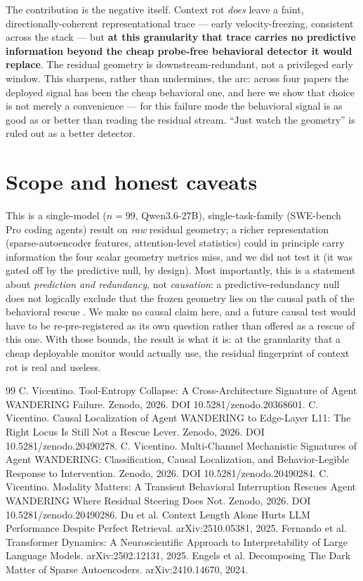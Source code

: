 \documentclass[11pt]{article}
\begin{document}
The contribution is the negative itself. Context rot \emph{does} leave a faint, directionally-coherent representational trace --- early velocity-freezing, consistent across the stack --- but \textbf{at this granularity that trace carries no predictive information beyond the cheap probe-free behavioral detector it would replace}. The residual geometry is downstream-redundant, not a privileged early window. This sharpens, rather than undermines, the arc: across four papers the deployed signal has been the cheap behavioral one, and here we show that choice is not merely a convenience --- for this failure mode the behavioral signal is as good as or better than reading the residual stream. ``Just watch the geometry'' is ruled out as a better detector.

\section{Scope and honest caveats}\label{sec:scope}

This is a single-model ($n{=}99$, Qwen3.6-27B), single-task-family (SWE-bench Pro coding agents) result on \emph{raw} residual geometry; a richer representation (sparse-autoencoder features, attention-level statistics) could in principle carry information the four scalar geometry metrics miss, and we did not test it (it was gated off by the predictive null, by design). Most importantly, this is a statement about \emph{prediction and redundancy}, not \emph{causation}: a predictive-redundancy null does not logically exclude that the frozen geometry lies on the causal path of the behavioral rescue \cite{modality}. We make no causal claim here, and a future causal test would have to be re-pre-registered as its own question rather than offered as a rescue of this one. With those bounds, the result is what it is: at the granularity that a cheap deployable monitor would actually use, the residual fingerprint of context rot is real and useless.

\begin{thebibliography}{99}
 C. Vicentino. Tool-Entropy Collapse: A Cross-Architecture Signature of Agent WANDERING Failure. Zenodo, 2026. DOI 10.5281/zenodo.20368601.
 C. Vicentino. Causal Localization of Agent WANDERING to Edge-Layer L11: The Right Locus Is Still Not a Rescue Lever. Zenodo, 2026. DOI 10.5281/zenodo.20490278.
 C. Vicentino. Multi-Channel Mechanistic Signatures of Agent WANDERING: Classification, Causal Localization, and Behavior-Legible Response to Intervention. Zenodo, 2026. DOI 10.5281/zenodo.20490284.
 C. Vicentino. Modality Matters: A Transient Behavioral Interruption Rescues Agent WANDERING Where Residual Steering Does Not. Zenodo, 2026. DOI 10.5281/zenodo.20490286.
 Du et al. Context Length Alone Hurts LLM Performance Despite Perfect Retrieval. arXiv:2510.05381, 2025.
 Fernando et al. Transformer Dynamics: A Neuroscientific Approach to Interpretability of Large Language Models. arXiv:2502.12131, 2025.
 Engels et al. Decomposing The Dark Matter of Sparse Autoencoders. arXiv:2410.14670, 2024.
\end{thebibliography}
\end{document}
